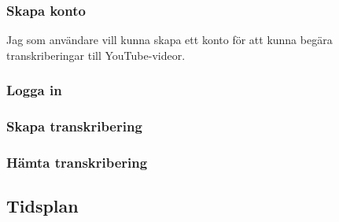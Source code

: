 \subsubsection{Skapa konto}
Jag som användare vill kunna skapa ett konto för att kunna begära
transkriberingar till YouTube-videor.

\subsubsection{Logga in}

\subsubsection{Skapa transkribering}

\subsubsection{Hämta transkribering}

\subsection{Tidsplan}
